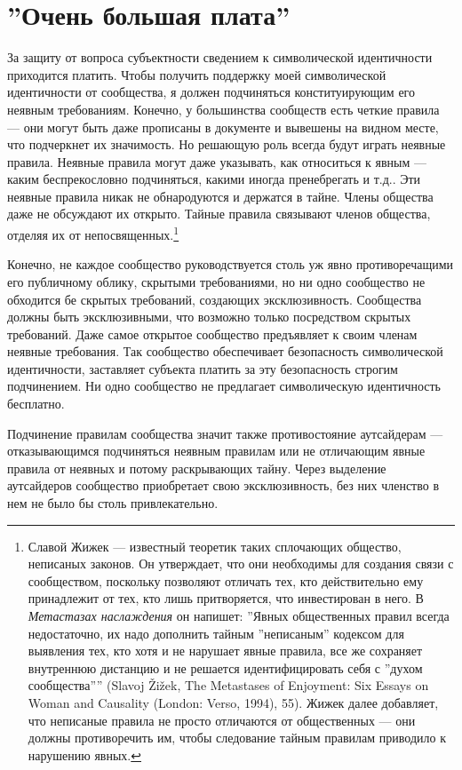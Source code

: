 \documentclass[12pt]{book}
\begin{document}
\section{''Очень большая плата''}

За защиту от вопроса субъектности сведением к символической идентичности приходится платить. Чтобы получить поддержку моей символической идентичности от сообщества, я должен подчиняться конституирующим его неявным требованиям. Конечно, у большинства сообществ есть четкие правила --- они могут быть даже прописаны в документе и вывешены на видном месте, что подчеркнет их значимость. Но решающую роль всегда будут играть неявные правила. Неявные правила могут даже указывать, как относиться к явным --- каким беспрекословно подчиняться, какими иногда пренебрегать и т.д.. Эти неявные правила никак не обнародуются и держатся в тайне. Члены общества даже не обсуждают их открыто. Тайные правила связывают членов общества, отделяя их от непосвященных.\footnote{Славой Жижек --- известный теоретик таких сплочающих общество, неписаных законов. Он утверждает, что они необходимы для создания связи с сообществом, поскольку позволяют отличать тех, кто действительно ему принадлежит от тех, кто лишь притворяется, что инвестирован в него. В \textit{Метастазах наслаждения} он напишет: ''Явных общественных правил всегда недостаточно, их надо дополнить тайным ''неписаным'' кодексом для выявления тех, кто хотя и не нарушает явные правила, все же сохраняет внутреннюю дистанцию и не решается идентифицировать себя с ''духом сообщества'''' (Slavoj Žižek, The Metastases of Enjoyment: Six Essays on Woman and Causality (London: Verso, 1994), 55). Жижек далее добавляет, что неписаные правила не просто отличаются от общественных --- они должны противоречить им, чтобы следование тайным правилам приводило к нарушению явных.}

Конечно, не каждое сообщество руководствуется столь уж явно противоречащими его публичному облику, скрытыми требованиями, но ни одно сообщество не обходится бе скрытых требований, создающих эксклюзивность. Сообщества должны быть эксклюзивными, что возможно только посредством скрытых требований. Даже самое открытое сообщество предъявляет к своим членам неявные требования. Так сообщество обеспечивает безопасность символической идентичности, заставляет субъекта платить за эту безопасность строгим подчинением. Ни одно сообщество не предлагает символическую идентичность бесплатно.

Подчинение правилам сообщества значит также противостояние аутсайдерам --- отказывающимся подчиняться неявным правилам или не отличающим явные правила от неявных и потому раскрывающих тайну. Через выделение аутсайдеров сообщество приобретает свою эксклюзивность, без них членство в нем не было бы столь привлекательно.
\end{document}

